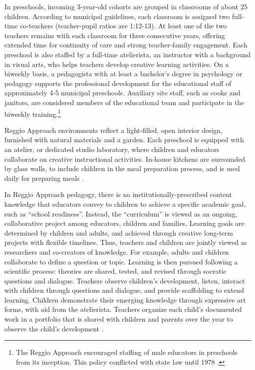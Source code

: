 In preschools, incoming 3-year-old cohorts are grouped in classrooms of about 25 children. According to municipal guidelines, each classroom is assigned two full-time co-teachers (teacher-pupil ratios are 1:12-13). At least one of the two teachers remains with each classroom for three consecutive years, offering extended time for continuity of care and strong teacher-family engagement. Each preschool is also staffed by a full-time atelierista, an instructor with a background in visual arts, who helps teachers develop creative learning activities. On a biweekly basis, a pedagogista with at least a bachelor's degree in psychology or pedagogy supports the professional development for the educational staff of approximately 4-5 municipal preschools. Auxiliary site staff, such as cooks and janitors, are considered members of the educational team and participate in the biweekly training.\footnote{The Reggio Approach encouraged staffing of male educators in preschools from its inception. This policy conflicted with state law until 1978 \citep{Hohnerlein_2015_Development-and-Diffusion}.}

Reggio Approach environments reflect a light-filled, open interior design, furnished with natural materials and a garden. Each preschool is equipped with an atelier, or dedicated studio laboratory, where children and educators collaborate on creative instructional activities. In-house kitchens are surrounded by glass walls, to include children in the meal preparation process, and is used daily for preparing meals \citep{Rinaldi_2006_ReggioEmilia_BOOK,Vecchi_2010_ReggioEmilia_BOOK}. 

In Reggio Approach pedagogy, there is no institutionally-prescribed content knowledge that educators convey to children to achieve a specific academic goal, such as ``school readiness''. Instead, the ``curriculum'' is viewed as an ongoing, collaborative project among educators, children and families. Learning goals are determined by children and adults, and achieved through creative long-term projects with flexible timelines. Thus, teachers and children are jointly viewed as researchers and co-creators of knowledge. For example, adults and children collaborate to define a question or topic. Learning is then pursued following a scientific process: theories are shared, tested, and revised through socratic questions and dialogue. Teachers observe children's development, listen, interact with children through questions and dialogue, and provide scaffolding to extend learning. Children demonstrate their emerging knowledge through expressive art forms, with aid from the atelierista. Teachers organize each child's documented work in a portfolio that is shared with children and parents over the year to observe the child's development \citep{Rinaldi_2006_ReggioEmilia_BOOK,Giudici-Nicolosi_2014_Reggio-Approach}.

